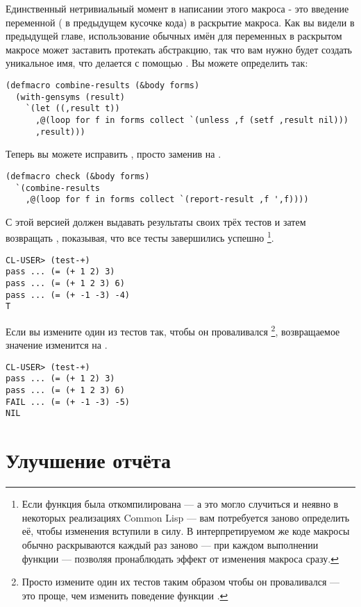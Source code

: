 Единственный нетривиальный момент в написании этого макроса - это введение переменной
( в предыдущем кусочке кода) в раскрытие макроса. Как вы видели в предыдущей
главе, использование обычных имён для переменных в раскрытом макросе может заставить
протекать абстракцию, так что вам нужно будет создать уникальное имя, что делается с
помощью . Вы можете определить  так:

\begin{lstlisting}
(defmacro combine-results (&body forms)
  (with-gensyms (result)
    `(let ((,result t))
      ,@(loop for f in forms collect `(unless ,f (setf ,result nil)))
      ,result)))
\end{lstlisting}

Теперь вы можете исправить , просто заменив  на
.

\begin{lstlisting}
(defmacro check (&body forms)
  `(combine-results
    ,@(loop for f in forms collect `(report-result ,f ',f))))
\end{lstlisting}

С этой версией   должен выдавать результаты своих трёх тестов и
затем возвращать , показывая, что все тесты завершились успешно \footnote{Если
  функция  была откомпилирована --- а это могло случиться и неявно в
  некоторых реализациях Common Lisp --- вам потребуется заново определить её, чтобы
  изменения вступили в силу. В интерпретируемом же коде макросы обычно раскрываются каждый
  раз заново --- при каждом выполнении функции --- позволяя пронаблюдать эффект от
  изменения макроса сразу.}.

\begin{lstlisting}
CL-USER> (test-+)
pass ... (= (+ 1 2) 3)
pass ... (= (+ 1 2 3) 6)
pass ... (= (+ -1 -3) -4)
T
\end{lstlisting}

Если вы измените один из тестов так, чтобы он проваливался \footnote{Просто измените один
  их тестов таким образом чтобы он проваливался --- это проще, чем изменить поведение
  функции \code{+}.}, возвращаемое значение изменится на .

\begin{lstlisting}
CL-USER> (test-+)
pass ... (= (+ 1 2) 3)
pass ... (= (+ 1 2 3) 6)
FAIL ... (= (+ -1 -3) -5)
NIL
\end{lstlisting}

\section{Улучшение отчёта}

